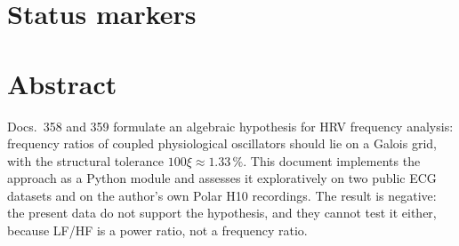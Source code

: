 \providecommand{\BM}{\textbf{[B]}}
\providecommand{\KM}{\textbf{[K]}}
\providecommand{\SM}{\textbf{[S]}}
\providecommand{\XM}{\textbf{[X]}}
\providecommand{\LM}{\textbf{[Q]}}

{}

\section*{Status markers}


\section*{Abstract}

Docs.~358 and 359 formulate an algebraic hypothesis for HRV frequency
analysis: frequency ratios of coupled physiological oscillators should lie
on a Galois grid, with the structural tolerance $100\xi\approx1.33\,\%$.
This document implements the approach as a Python module and assesses it
exploratively on two public ECG datasets and on the author's own Polar H10
recordings. The result is negative: the present data do not support the
hypothesis, and they cannot test it either, because LF/HF is a power
ratio, not a frequency ratio.


